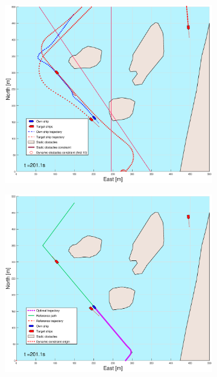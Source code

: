 \begin{figure}[ht]
\begin{subfigure}[b]{0.499\textwidth}
    \end{subfigure}
    \hfill
    \\
    \begin{subfigure}[b]{0.49\textwidth}
        \centering
        \includegraphics[width=\textwidth]{Images/Figures/Helloya_Rev/_Simple_0fig1_time=201}
    \end{subfigure}
    \hfill
    \begin{subfigure}[b]{0.499\textwidth}
        \centering
        \includegraphics[width=\textwidth]{Images/Figures/Helloya_Rev/_Simple_0fig999_time=201}

\end{subfigure}
\end{figure}
